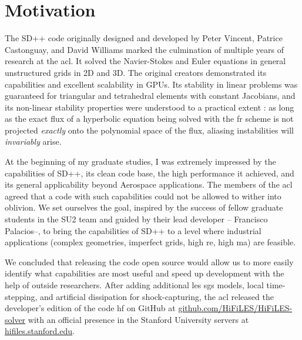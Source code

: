 \section{Motivation}
The SD++ code originally designed and developed by Peter Vincent, Patrice Castonguay, and David Williams \cite{castonguay2011} marked the culmination of multiple years of research at the \gls{acl}. It solved the Navier-Stokes and Euler equations in general unstructured grids in 2D and 3D. The original creators demonstrated its capabilities and excellent scalability in GPUs. Its stability in linear problems was guaranteed for triangular \cite{williams2013tri} and tetrahedral \cite{williams2013tet} elements with constant Jacobians, and its non-linear stability properties were understood to a practical extent \cite{jameson2012non}: as long as the exact flux of a hyperbolic equation being solved with the \gls{fr} scheme is not projected \emph{exactly} onto the polynomial space of the flux, aliasing instabilities will \emph{invariably} arise.

At the beginning of my graduate studies, I was extremely impressed by the capabilities of SD++, its clean code base, the high performance it achieved, and its general applicability beyond Aerospace applications. The members of the \gls{acl} agreed that a code with such capabilities could not be allowed to wither into oblivion. We set ourselves the goal, inspired by the success of fellow graduate students in the SU2 \cite{palacios2013stanford} team and guided by their lead developer -- Francisco Palacios--, to bring the capabilities of SD++ to a level where industrial applications (complex geometries, imperfect grids, high \gls{re}, high \gls{ma}) are feasible.

We concluded that releasing the code open source would allow us to more easily identify what capabilities are most useful and speed up development with the help of outside researchers. After adding additional \gls{les} \gls{sgs} models, local time-stepping, and artificial dissipation for shock-capturing, the \gls{acl} released the developer's edition of the code \gls{hf} on GitHub at \url{github.com/HiFiLES/HiFiLES-solver} with an official presence in the Stanford University servers at \url{hifiles.stanford.edu}.


